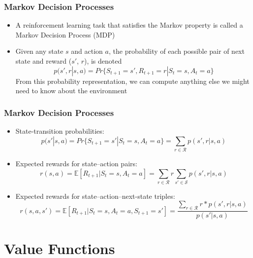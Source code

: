 \documentclass{beamer}
\begin{document}



\begin{frame}
\frametitle{Markov Decision Processes}
\begin{itemize}
\item A reinforcement learning task that satisfies the Markov property is called a Markov Decision Process (MDP)
\item Given any state $s$ and action $a$, the probability of each possible pair of next state and reward ($s'$, $r$), is denoted
\begin{equation}
p(s',r | s,a) = Pr\{S_{t+1} = s', R_{t+1} = r | S_t = s, A_t = a\}
\nonumber
\end{equation}
From this probability representation, we can compute anything else we might need to know about the environment
\end{itemize}
\end{frame}




\begin{frame}
\frametitle{Markov Decision Processes}
\begin{itemize}
\item State-transition probabilities:
\begin{equation}
p(s' | s,a) = Pr\{S_{t+1} = s' | S_t = s, A_t = a\} =  \sum_{r \in \mathscr{R} } p(s',r | s,a)
\nonumber
\end{equation}
\item Expected rewards for state--action pairs:
\begin{equation}
r(s,a) = \mathbb{E}[R_{t+1} | S_t = s, A_t = a] = \sum_{r \in \mathscr{R} } r \sum_{s' \in \mathscr{S} } p(s',r | s,a)
\nonumber
\end{equation}
\item Expected rewards for state--action--next-state triples:
\begin{equation}
r(s,a,s') = \mathbb{E}[R_{t+1} | S_t = s, A_t = a, S_{t+1}  = s'] =  \dfrac{ \sum_{r \in \mathscr{R} } r*p(s',r | s,a)}{p(s'| s,a)}
\nonumber
\end{equation}
\end{itemize}
\end{frame}


\section{Value Functions} %
\end{document}
